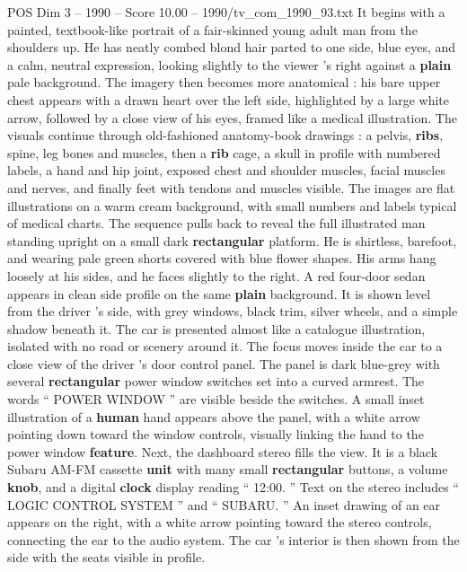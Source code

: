 \begin{textsample}{POS Dim 3 – 1990 – Score 10.00 – 1990/tv\_com\_1990\_93.txt}  \label{ex:f3_pos_051}
It begins with a painted, textbook-like portrait of a fair-skinned young adult man from the shoulders up.
He has neatly combed blond hair parted to one side, blue eyes, and a calm, neutral expression, looking slightly to the viewer ’s right against a \textbf{plain} pale background.
The imagery then becomes more anatomical : his bare upper chest appears with a drawn heart over the left side, highlighted by a large white arrow, followed by a close view of his eyes, framed like a medical illustration.
The visuals continue through old-fashioned anatomy-book drawings : a pelvis, \textbf{ribs}, spine, leg bones and muscles, then a \textbf{rib} cage, a skull in profile with numbered labels, a hand and hip joint, exposed chest and shoulder muscles, facial muscles and nerves, and finally feet with tendons and muscles visible.
The images are flat illustrations on a warm cream background, with small numbers and labels typical of medical charts.
The sequence pulls back to reveal the full illustrated man standing upright on a small dark \textbf{rectangular} platform.
He is shirtless, barefoot, and wearing pale green shorts covered with blue flower shapes.
His arms hang loosely at his sides, and he faces slightly to the right.
A red four-door sedan appears in clean side profile on the same \textbf{plain} background.
It is shown level from the driver ’s side, with grey windows, black trim, silver wheels, and a simple shadow beneath it.
The car is presented almost like a catalogue illustration, isolated with no road or scenery around it.
The focus moves inside the car to a close view of the driver ’s door control panel.
The panel is dark blue-grey with several \textbf{rectangular} power window switches set into a curved armrest.
The words “ POWER WINDOW ” are visible beside the switches.
A small inset illustration of a \textbf{human} hand appears above the panel, with a white arrow pointing down toward the window controls, visually linking the hand to the power window \textbf{feature}.
Next, the dashboard stereo fills the view.
It is a black Subaru AM-FM cassette \textbf{unit} with many small \textbf{rectangular} buttons, a volume \textbf{knob}, and a digital \textbf{clock} display reading “ 12:00. ” Text on the stereo includes “ LOGIC CONTROL SYSTEM ” and “ SUBARU. ” An inset drawing of an ear appears on the right, with a white arrow pointing toward the stereo controls, connecting the ear to the audio system.
The car ’s interior is then shown from the side with the seats visible in profile.

\end{textsample}
